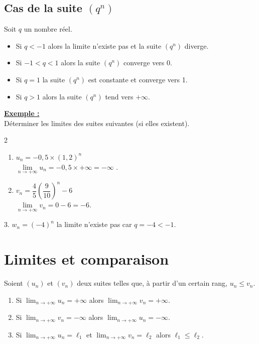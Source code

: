 \documentclass[11pt,twoside, openany]{extbook}
\begin{document}
\subsection{Cas de la suite {\boldmath $(q^n)$}}
\begin{prop}
Soit $q$ un nombre réel.
\begin{itemize}
\item Si $q<-1$ alors la limite n'existe pas et la suite $(q^n)$ diverge.
\item Si $-1<q<1$ alors la suite $(q^n)$ converge vers 0.
\item Si $q=1$ la suite $(q^n)$ est constante et converge vers 1. 
\item Si $q>1$ alors la suite $(q^n)$ tend vers $+\infty$.
\end{itemize}
\end{prop}
\medskip
 \noindent \textbf{\ul{Exemple :}}\\
Déterminer les limites des suites suivantes (si elles existent). 
\begin{multicols}{2}
\begin{enumerate}
\item $u_n= -0,5\times (1,2)^n$ \vspace{0.6em}\\  $\lim\limits_{n \rightarrow +\infty}u_n=-0,5 \times +\infty = -\infty$ .
\item $v_n=\dfrac{4}{5}\left(\dfrac{9}{10}\right)^n-6$ \vspace{0.6em}\\  $\lim\limits_{n \rightarrow +\infty}v_n=0-6=-6$.
\end{enumerate}
\end{multicols}
$3.$ $w_n=(-4)^n$ la limite n'existe pas car $q=-4<-1$.







\section{Limites et comparaison }
\begin{trm}
    Soient $(u_n)$ et $(v_n)$ deux suites telles que, à partir d'un certain rang, $u_n \leqslant v_n$.
\begin{enumerate}
\item Si $\displaystyle \lim_{n \to +\infty} u_n=+\infty$ alors $\displaystyle \lim_{n \to +\infty} v_n=+\infty$.\vspace{0.5em}
\item Si $\displaystyle \lim_{n \to +\infty} v_n=-\infty$ alors $\displaystyle \lim_{n \to +\infty} u_n=-\infty$.\vspace{0.5em}
\item Si $\displaystyle \lim_{n \to +\infty} u_n=\ell_1$ et $\displaystyle \lim_{n \to +\infty} v_n=\ell_2$  alors $\ell_1\leqslant\ell_2$.
\end{enumerate}
\end{trm}
\end{document}
